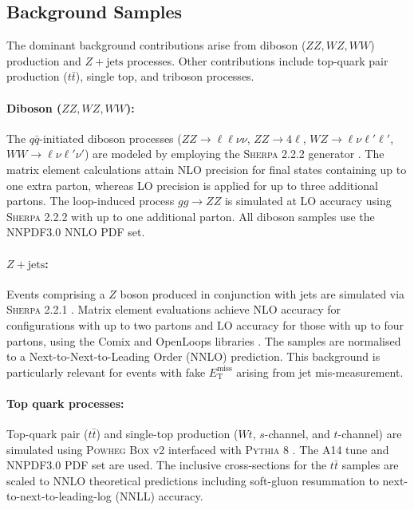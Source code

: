 \subsection{Background Samples}
\label{subsec:bkg_samples}

The dominant background contributions arise from diboson ($ZZ, WZ, WW$) production and $Z+\text{jets}$ processes. Other contributions include top-quark pair production ($t\bar{t}$), single top, and triboson processes.

\paragraph{\textbf{Diboson ($ZZ, WZ, WW$):}}
The $q\bar{q}$-initiated diboson processes ($ZZ \to \ell\ell\nu\nu$, $ZZ \to 4\ell$, $WZ \to \ell\nu\ell'\ell'$, $WW \to \ell\nu \ell'\nu'$) are modeled by employing the \textsc{Sherpa} 2.2.2 generator \cite{Bothmann:2019yzt}. The matrix element calculations attain NLO precision for final states containing up to one extra parton, whereas LO precision is applied for up to three additional partons. The loop-induced process $gg \to ZZ$ is simulated at LO accuracy using \textsc{Sherpa} 2.2.2 with up to one additional parton. All diboson samples use the NNPDF3.0 NNLO PDF set.

\paragraph{\textbf{$Z+\text{jets}$:}}
Events comprising a $Z$ boson produced in conjunction with jets are simulated via \textsc{Sherpa} 2.2.1 \cite{Bothmann:2019yzt}. Matrix element evaluations achieve NLO accuracy for configurations with up to two partons and LO accuracy for those with up to four partons, using the Comix and OpenLoops libraries \cite{Cascioli:2011va}. The samples are normalised to a Next-to-Next-to-Leading Order (NNLO) prediction. This background is particularly relevant for events with fake $E_{\text{T}}^{\text{miss}}$ arising from jet mis-measurement.

\paragraph{\textbf{Top quark processes:}}
Top-quark pair ($t\bar{t}$) and single-top production ($Wt$, $s$-channel, and $t$-channel) are simulated using \textsc{Powheg Box} v2 \cite{Nason:2009xu, Hamilton:2012rf} interfaced with \textsc{Pythia} 8 \cite{Sjostrand:2007gs}. The A14 tune and NNPDF3.0 PDF set are used. The inclusive cross-sections for the $t\bar{t}$ samples are scaled to NNLO theoretical predictions including soft-gluon resummation to next-to-next-to-leading-log (NNLL) accuracy.

